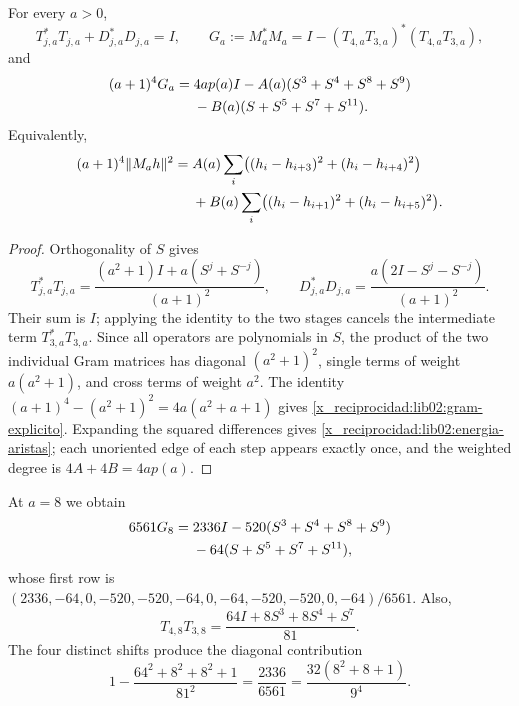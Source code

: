 \begin{proposition}
\label{x_reciprocidad:lib02:gram}
For every \(a>0\),
\[
 T_{j,a}^*T_{j,a}+D_{j,a}^*D_{j,a}=I,\qquad
 G_a:=M_a^*M_a=I-(T_{4,a}T_{3,a})^*(T_{4,a}T_{3,a}),
\]
and
\begin{align}
 (a+1)^4G_a={}&4ap(a)I
 -A(a)(S^3+S^4+S^8+S^9)\notag\\
 &-B(a)(S+S^5+S^7+S^{11}).
 \label{x_reciprocidad:lib02:gram-explicito}
\end{align}
Equivalently,
\begin{align}
 (a+1)^4\|M_ah\|^2={}&A(a)\sum_i
 \bigl((h_i-h_{i+3})^2+(h_i-h_{i+4})^2\bigr)\notag\\
 &+B(a)\sum_i
 \bigl((h_i-h_{i+1})^2+(h_i-h_{i+5})^2\bigr).
 \label{x_reciprocidad:lib02:energia-aristas}
\end{align}
\end{proposition}
\begin{proof}
Orthogonality of \(S\) gives
\[
 T_{j,a}^*T_{j,a}
 =\frac{(a^2+1)I+a(S^j+S^{-j})}{(a+1)^2},\qquad
 D_{j,a}^*D_{j,a}
 =\frac{a(2I-S^j-S^{-j})}{(a+1)^2}.
\]
Their sum is \(I\); applying the identity to the two stages cancels the intermediate term \(T_{3,a}^*T_{3,a}\). Since all operators are polynomials in \(S\), the product of the two individual Gram matrices has diagonal \((a^2+1)^2\), single terms of weight \(a(a^2+1)\), and cross terms of weight \(a^2\). The identity \((a+1)^4-(a^2+1)^2=4a(a^2+a+1)\) gives \eqref{x_reciprocidad:lib02:gram-explicito}. Expanding the squared differences gives \eqref{x_reciprocidad:lib02:energia-aristas}; each unoriented edge of each step appears exactly once, and the weighted degree is \(4A+4B=4ap(a)\).
\end{proof}

At \(a=8\) we obtain
\begin{align}
 6561G_8={}&2336I-520(S^3+S^4+S^8+S^9)\notag\\
 &-64(S+S^5+S^7+S^{11}),
 \label{x_reciprocidad:lib02:gram-nonadico}
\end{align}
whose first row is \((2336,-64,0,-520,-520,-64,0,-64,-520,-520,0,-64)/6561\). Also,
\[
 T_{4,8}T_{3,8}=\frac{64I+8S^3+8S^4+S^7}{81}.
\]
The four distinct shifts produce the diagonal contribution
\[
 1-\frac{64^2+8^2+8^2+1}{81^2}
 =\frac{2336}{6561}
 =\frac{32(8^2+8+1)}{9^4}.
\]

